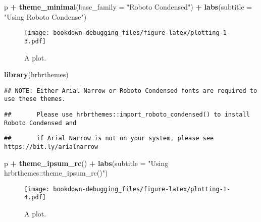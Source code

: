 \documentclass[ngerman,a4paper,]{scrartcl}
\newenvironment{Shaded}{\begin{snugshade}}{\end{snugshade}}
\newcommand{\DataTypeTok}[1]{\textcolor[rgb]{0.13,0.29,0.53}{#1}}
\newcommand{\KeywordTok}[1]{\textcolor[rgb]{0.13,0.29,0.53}{\textbf{#1}}}
\newcommand{\NormalTok}[1]{#1}
\newcommand{\OperatorTok}[1]{\textcolor[rgb]{0.81,0.36,0.00}{\textbf{#1}}}
\newcommand{\StringTok}[1]{\textcolor[rgb]{0.31,0.60,0.02}{#1}}
\begin{document}
\begin{Shaded}
\begin{Highlighting}[]
\NormalTok{p }\OperatorTok{+}\StringTok{ }\KeywordTok{theme_minimal}\NormalTok{(}\DataTypeTok{base_family =} \StringTok{"Roboto Condensed"}\NormalTok{) }\OperatorTok{+}
\StringTok{   }\KeywordTok{labs}\NormalTok{(}\DataTypeTok{subtitle =} \StringTok{"Using Roboto Condense"}\NormalTok{)}
\end{Highlighting}
\end{Shaded}

\begin{figure}
\centering
\texttt{[image: bookdown-debugging\_files/figure-latex/plotting-1-3.pdf]}
\caption{\label{fig:plotting-1-3}A plot.}
\end{figure}

\begin{Shaded}
\begin{Highlighting}[]
\KeywordTok{library}\NormalTok{(hrbrthemes)}
\end{Highlighting}
\end{Shaded}

\begin{verbatim}
## NOTE: Either Arial Narrow or Roboto Condensed fonts are required to use these themes.
\end{verbatim}

\begin{verbatim}
##       Please use hrbrthemes::import_roboto_condensed() to install Roboto Condensed and
\end{verbatim}

\begin{verbatim}
##       if Arial Narrow is not on your system, please see https://bit.ly/arialnarrow
\end{verbatim}

\begin{Shaded}
\begin{Highlighting}[]
\NormalTok{p }\OperatorTok{+}\StringTok{ }\KeywordTok{theme_ipsum_rc}\NormalTok{() }\OperatorTok{+}
\StringTok{   }\KeywordTok{labs}\NormalTok{(}\DataTypeTok{subtitle =} \StringTok{"Using hrbrthemes::theme_ipsum_rc()"}\NormalTok{)}
\end{Highlighting}
\end{Shaded}

\begin{figure}
\centering
\texttt{[image: bookdown-debugging\_files/figure-latex/plotting-1-4.pdf]}
\caption{\label{fig:plotting-1-4}A plot.}
\end{figure}
\end{document}
